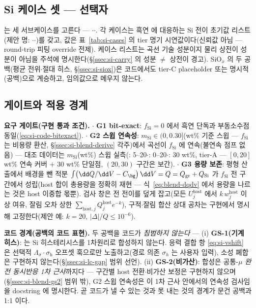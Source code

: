 \subsection{Si 케이스 셋 ---  선택자}\label{ssec:code-caseset}
 는 세 서브케이스를 고른다 --- $\cdot$$\cdot$.
각 케이스는 흑연  에 대응하는 Si 전이 초기값 리스트(제안 명:
$\cdot$$\cdot$)를 갖고, 값은 표~\ref{tab:si-cases}
의 tier 명기 시연값이다(신뢰값 아님 --- round-trip 피팅 override 전제). 케이스 리스트는 곡선 기술
성분이지 물리 상전이 성분이 아님을 주석에 명시한다(\S\ref{ssec:si-carry} 의 성분 $\ne$ 상전이 경고).
SiO$_x$ 의 두 공백(평균 전위$\cdot$절대 히스, \S\ref{ssec:si-siox})은 코드에서도 tier-C placeholder
또는 명시적 (공백)으로 계승하고, 임의값으로 메우지 않는다.

\subsection{게이트와 적용 경계}\label{ssec:code-gates}
\begin{codebox}
\textbf{요구 게이트(구현 통과 조건).}
$\cdot$ \textbf{G1 bit-exact}: $f_\mathrm{Si}{=}0$ 에서 흑연 단독과 부동소수점 동일(\eqref{eq:si-code-bitexact}).
$\cdot$ \textbf{G2 스윕 연속성}: $m_\mathrm{Si}\in(0,0.30]$(wt\% 기준 스윕 --- $f_\mathrm{Si}$ 는 비용량 환산, \S\ref{ssec:si-blend-derive} 각주)에서 곡선이 $f_\mathrm{Si}$ 에 연속(불연속 점프 없음)
--- 대조 데이터는 $m_\mathrm{Si}$(wt\%) 스윕 실측(\cite{gautam_blend2024}: 5--20$\cdot$\cite{moyassari_blend2022}: 0--20$\cdot$\cite{chatzogiannakis_blend2025}: 30 wt\%, tier-A --- $[0,20]$ wt\% 연속 커버 $+$ 30 wt\% 단일점, $(20,30)$ 구간은 보간).
$\cdot$ \textbf{G3 용량 보존}: 평형 산출에서 배경을 뺀 적분
$\int\bigl(\dd Q/\dd V-C_\bg\bigr)\,\dd V=Q=Q_\mathrm{gr}+Q_\mathrm{Si}$ 가 $f_\mathrm{Si}$
전 구간에서 성립(host 합이 총용량을 정확히 재현 --- 식~\eqref{eq:blend-dqdv} 에서 용량을 나르는 것은
host 이중합 몫뿐). 검사 창은 전 전이를 덮게 잡고(모든 $U_j^\mathrm{host}$ 에서 $k\,w_j^\mathrm{host}$
이상 여유, 잘림 오차 상한 $\sum_{\mathrm{host},j}Q_j^\mathrm{host}e^{-k}$), 구적$\cdot$잘림 합산 상대
공차는 구현에서 명시해 고정한다(제안 예: $k{=}20$, $|\Delta|/Q\le10^{-6}$).
\end{codebox}

\begin{warnbox}
\textbf{코드 경계(공백의 코드 표현).} 두 공백을 코드가 \emph{침범하지 않는다} --- (i) \textbf{GS-1(기계
히스)}:  는 Si 히스테리시스를 1차원리로 합성하지 않는다. 응력 결합 항
\eqref{eq:si-vshift} 은 선택적 $\Lambda_\sigma\!\cdot\!\sigma_\mathrm{h}$ 오프셋 훅으로만 노출하고(경로 의존 $\sigma_h$
는 사용자 입력), 소성 폐합은 구현하지 않는다(\S\ref{ssec:si-lc-gap} 범위 선언). (ii) \textbf{GS-2(비가산)}:
합성은 공통-$\mu$ \emph{완전 동시반응 1차 근사}까지다 --- 구간별 host 전환$\cdot$비가산 보정은 구현하지
않으며(\S\ref{ssec:si-blend-gs2} 범위 밖), G2 스윕 연속성은 이 1차 근사 안에서의 연속성 검사임을 docstring
에 명시한다. 곧 코드가 낼 수 있는 것과 못 내는 것의 경계가 문건 공백과 1:1 이다.
\end{warnbox}

